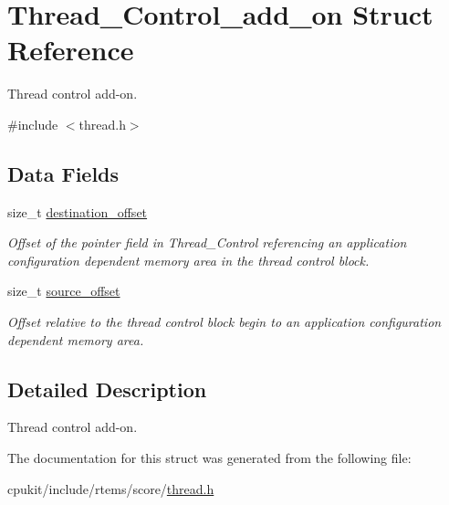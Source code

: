 \hypertarget{structThread__Control__add__on}{}\section{Thread\+\_\+\+Control\+\_\+add\+\_\+on Struct Reference}
\label{structThread__Control__add__on}


Thread control add-\/on.  




{\ttfamily \#include $<$thread.\+h$>$}

\subsection*{Data Fields}
\begin{DoxyCompactItemize}
\item 
\mbox{\label{structThread__Control__add__on_a1f1a4a29d109f628231bb4fb49ce3276}} 
size\+\_\+t \mbox{\hyperlink{structThread__Control__add__on_a1f1a4a29d109f628231bb4fb49ce3276}{destination\+\_\+offset}}
\begin{DoxyCompactList}\small\item\em Offset of the pointer field in Thread\+\_\+\+Control referencing an application configuration dependent memory area in the thread control block. \end{DoxyCompactList}\item 
\mbox{\label{structThread__Control__add__on_a11d03c9eed22f2e12849d80093903744}} 
size\+\_\+t \mbox{\hyperlink{structThread__Control__add__on_a11d03c9eed22f2e12849d80093903744}{source\+\_\+offset}}
\begin{DoxyCompactList}\small\item\em Offset relative to the thread control block begin to an application configuration dependent memory area. \end{DoxyCompactList}\end{DoxyCompactItemize}


\subsection{Detailed Description}
Thread control add-\/on. 

The documentation for this struct was generated from the following file\+:\begin{DoxyCompactItemize}
\item 
cpukit/include/rtems/score/\mbox{\hyperlink{score_2thread_8h}{thread.\+h}}\end{DoxyCompactItemize}
